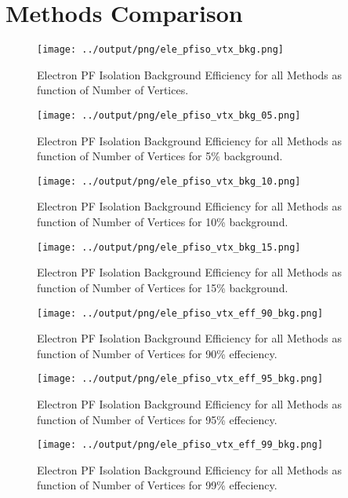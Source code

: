 \documentclass[11pt]{book}
\begin{document}
\section{Methods Comparison}
\begin{figure}[htb]
\centering
\texttt{[image: ../output/png/ele\_pfiso\_vtx\_bkg.png]}
\caption{Electron PF Isolation Background Efficiency for all Methods as function of Number of Vertices.}
\label{fig:ele_pfiso_vtx_bkg}
\end{figure}

\begin{figure}[htb]
\centering
\texttt{[image: ../output/png/ele\_pfiso\_vtx\_bkg\_05.png]}
\caption{Electron PF Isolation Background Efficiency for all Methods as function of Number of Vertices for 5\% background.}
\label{fig:ele_pfiso_vtx_bkg_05}
\end{figure}

\begin{figure}[htb]
\centering
\texttt{[image: ../output/png/ele\_pfiso\_vtx\_bkg\_10.png]}
\caption{Electron PF Isolation Background Efficiency for all Methods as function of Number of Vertices for 10\% background.}
\label{fig:ele_pfiso_vtx_bkg_10}
\end{figure}

\begin{figure}[htb]
\centering
\texttt{[image: ../output/png/ele\_pfiso\_vtx\_bkg\_15.png]}
\caption{Electron PF Isolation Background Efficiency for all Methods as function of Number of Vertices for 15\% background.}
\label{fig:ele_pfiso_vtx_bkg_15}
\end{figure}

\begin{figure}[htb]
\centering
\texttt{[image: ../output/png/ele\_pfiso\_vtx\_eff\_90\_bkg.png]}
\caption{Electron PF Isolation Background Efficiency for all Methods as function of Number of Vertices for 90\% effeciency.}
\label{fig:ele_pfiso_vtx_eff_90_bkg}
\end{figure}

\begin{figure}[htb]
\centering
\texttt{[image: ../output/png/ele\_pfiso\_vtx\_eff\_95\_bkg.png]}
\caption{Electron PF Isolation Background Efficiency for all Methods as function of Number of Vertices for 95\% effeciency.}
\label{fig:ele_pfiso_vtx_eff_95_bkg}
\end{figure}

\begin{figure}[htb]
\centering
\texttt{[image: ../output/png/ele\_pfiso\_vtx\_eff\_99\_bkg.png]}
\caption{Electron PF Isolation Background Efficiency for all Methods as function of Number of Vertices for 99\% effeciency.}
\label{fig:ele_pfiso_vtx_eff_99_bkg}
\end{figure}
\clearpage
\end{document}
